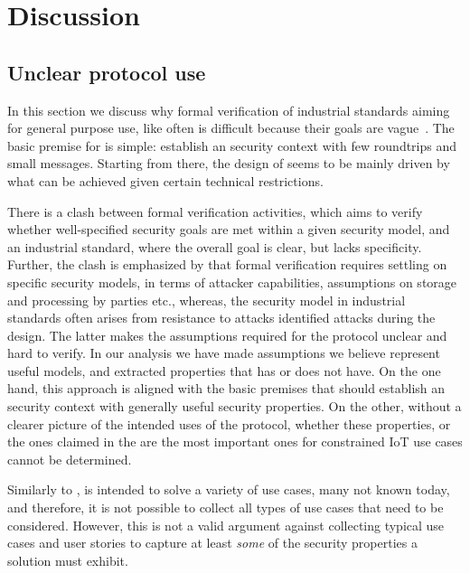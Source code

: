 \documentclass[runningheads,draft,x11names]{llncs}
\begin{document}
\section{Discussion}
\label{sec:discussion}
\subsection{Unclear protocol use}
\label{sec:unclearProtocolUse}
In this section we discuss why formal verification of industrial standards
aiming for general purpose use, like \mEdhoc{} often is difficult because their
goals are vague~\cite{DBLP:conf/ccs/BasinDHRSS18}.
%
The basic premise for \mEdhoc{} is simple: establish an \mOscore{} security
context with few roundtrips and small messages.
%
Starting from there, the design of \mEdhoc{} seems to be mainly driven by what
can be achieved given certain technical restrictions.
%

There is a clash between formal verification activities, which aims to verify
whether well-specified security goals are met within a given security model, and
an industrial standard, where the overall goal is clear, but lacks
specificity.
%
Further, the clash is emphasized by that formal verification requires settling
on specific security models, in terms of attacker capabilities, assumptions on
storage and processing by parties etc., whereas, the security model in
industrial standards often arises from resistance to attacks identified
attacks during the design.
%
The latter makes the assumptions required for the protocol unclear and hard to
verify.
%
In our analysis we have made assumptions we believe represent useful models,
and extracted properties that \mEdhoc{} has or does not have.
%
On the one hand, this approach is aligned with the basic premises that
\mEdhoc{} should establish
an \mOscore{} security context with generally useful security properties.
%
On the other, without a clearer picture of the intended uses of the
protocol, whether these properties, or the ones claimed in the \mSpec{} are
the most important ones for constrained IoT use cases cannot be determined.
%

Similarly to \mDandTls{}, \mEdhoc{} is intended to solve a variety of use cases,
many not known today, and therefore, it is not possible to collect all types
of use cases that need to be considered.
%
However, this is not a valid argument against collecting typical use cases and
user stories to capture at least \emph{some} of the security properties a
solution must exhibit.
%
\end{document}
